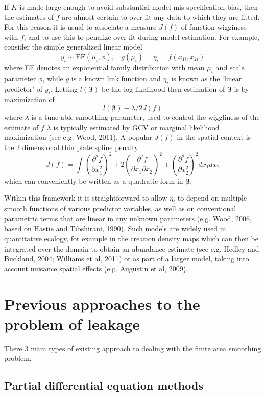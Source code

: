 \documentclass[useAMS, referee]{biom}
\newcommand{\pdif}[2]{\frac{\partial #1}{\partial #2}}
\newcommand{\pddif}[3]{\frac{\partial^2 #1}{\partial #2 \partial #3}}
\begin{document}
If $K$ is made large enough to avoid substantial model mis-specification bias, then the estimates of $f$ are almost certain to over-fit any data to which they are fitted. For this reason it is usual to associate a measure $J(f)$ of function wigginess with $f$, and to use this to penalize over fit during model estimation. 
For example, consider the simple generalized linear model  
$$
y_i \sim \text{EF}(\mu_i, \phi),~~~~ g(\mu_i) = \eta_i =f(x_{1i},x_{2i})
$$
where EF denotes an exponential family distribution with mean $\mu_i$ and scale parameter $\phi$, while $g$ is a known link function and $\eta_i$ is known as the `linear predictor' of $y_i$. Letting $l({\bm \beta})$ be the log likelihood then estimation of $\bm \beta$ is by maximization of 
$$
l({\bm \beta}) - \lambda/2 J(f)
$$ 
where $\lambda$ is a tune-able smoothing parameter, used to control the wiggliness of the estimate of $f$ $\lambda $ is typically estimated by GCV or marginal likelihood maximization (see e.g. Wood, 2011). A popular $J(f)$ in the spatial context is the 2 dimensional thin plate spline penalty
$$
J(f) = \int \left (\pdif{^2 f}{x_1^2}\right )^2 + 2\left ( \pddif{f}{x_1}{x_2}\right )^2 + \left (\pdif{^2 f}{x_2^2}\right )^2 dx_1 dx_2
$$
which can conveniently be written as a quadratic form in $\bm \beta$. 

Within this framework it is straightforward to allow $\eta_i$ to depend on multiple smooth functions of various predictor variables, as well as on conventional parametric terms that are linear in any unknown parameters (e.g. Wood, 2006, based on Hastie and Tibshirani, 1990). Such models are widely used in quantitative ecology, for example in the creation density maps which can then be integrated over the domain to obtain an abundance estimate (see e.g.  Hedley and Buckland, 2004; Williams et al, 2011) or as part of a larger model, taking into account nuisance spatial effects (e.g. Augustin et al, 2009). 

\section{Previous approaches to the problem of leakage}
\label{previous-approaches}

There 3 main types of existing approach to dealing with the finite area smoothing problem.

\subsection*{Partial differential equation methods}
\end{document}
